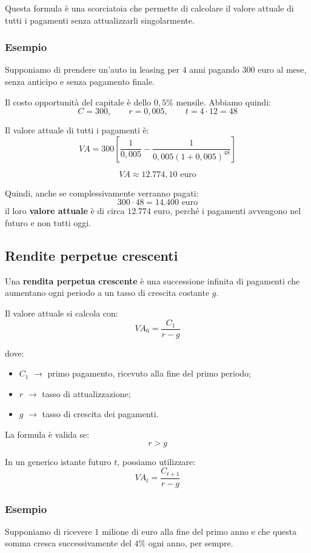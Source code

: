 \noindent Questa formula è una scorciatoia che permette di calcolare il valore attuale di tutti 
i pagamenti senza attualizzarli singolarmente.

\subsubsection*{Esempio}
Supponiamo di prendere un'auto in leasing per \(4\) anni pagando \(300\) euro al mese, 
senza anticipo e senza pagamento finale.

\noindent Il costo opportunità del capitale è dello \(0{,}5\%\) mensile. Abbiamo quindi:
\[
C=300, \qquad r=0{,}005, \qquad t=4\cdot12=48
\]

\noindent Il valore attuale di tutti i pagamenti è:
\[
VA=300\left[
\frac{1}{0{,}005}
-\frac{1}{0{,}005(1+0{,}005)^{48}}
\right]
\]

\[
VA \approx 12.774{,}10\text{ euro}
\]

\noindent Quindi, anche se complessivamente verranno pagati:
\[
300\cdot48=14.400\text{ euro}
\]
il loro \textbf{valore attuale} è di circa \(12.774\) euro, perché i pagamenti 
avvengono nel futuro e non tutti oggi.

\subsection{Rendite perpetue crescenti}
Una \textbf{rendita perpetua crescente} è una successione infinita di pagamenti che aumentano ogni 
periodo a un tasso di crescita costante \(g\).

\noindent Il valore attuale si calcola con:
\[
VA_0 = \frac{C_1}{r-g}
\]

\noindent dove:
\begin{itemize}
    \item \(C_1\) $\rightarrow$ primo pagamento, ricevuto alla fine del primo periodo;
    \item \(r\) $\rightarrow$ tasso di attualizzazione;
    \item \(g\) $\rightarrow$ tasso di crescita dei pagamenti.
\end{itemize}

\noindent La formula è valida se:
\[
r > g
\]

\noindent In un generico istante futuro \(t\), possiamo utilizzare:
\[
VA_t = \frac{C_{t+1}}{r-g}
\]

\subsubsection*{Esempio}
Supponiamo di ricevere \(1\) milione di euro alla fine del primo anno e che questa 
somma cresca successivamente 
del \(4\%\) ogni anno, per sempre.

